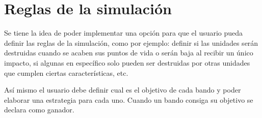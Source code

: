 \section{Reglas de la simulaci\'on}

Se tiene la idea de poder implementar una opci\'on para que el usuario pueda definir las reglas de la simulaci\'on, como por ejemplo: definir si las unidades ser\'an destruidas cuando se acaben sus puntos de vida o ser\'an baja al recibir un \'unico impacto, si algunas en espec\'ifico solo pueden ser destruidas por otras unidades que cumplen ciertas caracter\'isticas, etc.

As\'i mismo el usuario debe definir cual es el objetivo de cada bando y poder elaborar una estrategia para cada uno. Cuando un bando consiga su objetivo se declara como ganador.

 